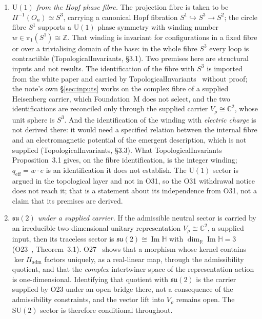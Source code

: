 \documentclass[11pt,a4paper]{article}
\theoremstyle{definition}
\newcommand{\SU}{\mathrm{SU}}
\newcommand{\su}{\mathfrak{su}}
\newcommand{\UU}{\mathrm{U}}
\newcommand{\ImH}{\operatorname{Im}\mathbb{H}}
\begin{document}
    \begin{enumerate}
      \item \textit{$\UU(1)$ from the Hopf phase fibre.}
      The projection fibre is taken to be $\Pi^{-1}(O_n) \simeq S^3$, carrying a canonical Hopf
      fibration $S^1 \hookrightarrow S^3 \to S^2$; the circle fibre $S^1$ supports a $\UU(1)$
      phase symmetry with winding number $w \in \pi_1(S^1) \cong \mathbb{Z}$.
      That winding is invariant for configurations in a fixed fibre or over a trivialising
      domain of the base: in the whole fibre $S^3$ every loop is contractible
      (TopologicalInvariants, §3.1).
      Two premises here are structural inputs and not results.
      The identification of the fibre with $S^3$ is imported from the white paper and carried by
      TopologicalInvariants~\cite{Beau2026k} without proof; the note's own §\ref{sec:inputs}
      works on the complex fibre of a supplied Heisenberg carrier, which Foundation~M does not
      select, and the two identifications are reconciled only through the supplied carrier
      $V_\rho \cong \mathbb{C}^2$, whose unit sphere is $S^3$.
      And the identification of the winding with \emph{electric charge} is not derived there:
      it would need a specified relation between the internal fibre and an electromagnetic
      potential of the emergent description, which is not supplied (TopologicalInvariants,
      §3.3).
      What TopologicalInvariants Proposition~3.1 gives, on the fibre identification, is the integer
      winding; $q_{\mathrm{eff}} = w \cdot e$ is an identification it does not establish.
      The $\UU(1)$ sector is argued in the topological layer and not in O31, so the O31 withdrawal
      notice does not reach it; that is a statement about its independence from O31, not a claim
      that its premises are derived.

      \item \textit{$\su(2)$ under a supplied carrier.}
      If the admissible neutral sector is carried by an irreducible two-dimensional unitary
      representation $V_\rho \cong \mathbb{C}^2$, a supplied input, then its traceless sector is
      $\su(2) \cong \ImH$ with $\dim_\mathbb{R} \ImH = 3$ (O23~\cite{Beau2026a27}, Theorem~3.1).
      O27~\cite{Beau2026a31} shows that a morphism whose kernel contains
      $\ker \Pi_{\mathrm{adm}}$ factors uniquely, as a real-linear map, through the admissibility
      quotient, and that the \emph{complex} intertwiner space of the representation action is
      one-dimensional.
      Identifying that quotient with $\su(2)$ is the carrier supplied by O23 under an open bridge
      there, not a consequence of the admissibility constraints, and the vector lift into
      $V_\rho$ remains open.
      The $\SU(2)$ sector is therefore conditional throughout.


\end{enumerate}
\end{document}
